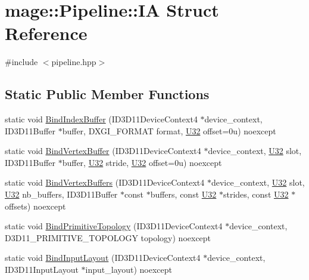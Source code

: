 \hypertarget{structmage_1_1_pipeline_1_1_i_a}{}\section{mage\+:\+:Pipeline\+:\+:IA Struct Reference}
\label{structmage_1_1_pipeline_1_1_i_a}


{\ttfamily \#include $<$pipeline.\+hpp$>$}

\subsection*{Static Public Member Functions}
\begin{DoxyCompactItemize}
\item 
static void \hyperlink{structmage_1_1_pipeline_1_1_i_a_a93bfdb872e9f2ed8d7530d2096d19612}{Bind\+Index\+Buffer} (I\+D3\+D11\+Device\+Context4 $\ast$device\+\_\+context, I\+D3\+D11\+Buffer $\ast$buffer, D\+X\+G\+I\+\_\+\+F\+O\+R\+M\+AT format, \hyperlink{namespacemage_a41c104c036fba3756a74e19f793eeaa1}{U32} offset=0u) noexcept
\item 
static void \hyperlink{structmage_1_1_pipeline_1_1_i_a_a3baadb42f3ed9d721e5b631cdf42fcd4}{Bind\+Vertex\+Buffer} (I\+D3\+D11\+Device\+Context4 $\ast$device\+\_\+context, \hyperlink{namespacemage_a41c104c036fba3756a74e19f793eeaa1}{U32} slot, I\+D3\+D11\+Buffer $\ast$buffer, \hyperlink{namespacemage_a41c104c036fba3756a74e19f793eeaa1}{U32} stride, \hyperlink{namespacemage_a41c104c036fba3756a74e19f793eeaa1}{U32} offset=0u) noexcept
\item 
static void \hyperlink{structmage_1_1_pipeline_1_1_i_a_a1c9c3a65014815a94a5c4f69809201b9}{Bind\+Vertex\+Buffers} (I\+D3\+D11\+Device\+Context4 $\ast$device\+\_\+context, \hyperlink{namespacemage_a41c104c036fba3756a74e19f793eeaa1}{U32} slot, \hyperlink{namespacemage_a41c104c036fba3756a74e19f793eeaa1}{U32} nb\+\_\+buffers, I\+D3\+D11\+Buffer $\ast$const $\ast$buffers, const \hyperlink{namespacemage_a41c104c036fba3756a74e19f793eeaa1}{U32} $\ast$strides, const \hyperlink{namespacemage_a41c104c036fba3756a74e19f793eeaa1}{U32} $\ast$offsets) noexcept
\item 
static void \hyperlink{structmage_1_1_pipeline_1_1_i_a_ae3063a8930a91dcb7b94bcdaa866e93f}{Bind\+Primitive\+Topology} (I\+D3\+D11\+Device\+Context4 $\ast$device\+\_\+context, D3\+D11\+\_\+\+P\+R\+I\+M\+I\+T\+I\+V\+E\+\_\+\+T\+O\+P\+O\+L\+O\+GY topology) noexcept
\item 
static void \hyperlink{structmage_1_1_pipeline_1_1_i_a_ae9aa0db517b6ab2fa56d30e4dbc804e7}{Bind\+Input\+Layout} (I\+D3\+D11\+Device\+Context4 $\ast$device\+\_\+context, I\+D3\+D11\+Input\+Layout $\ast$input\+\_\+layout) noexcept
\end{DoxyCompactItemize}



